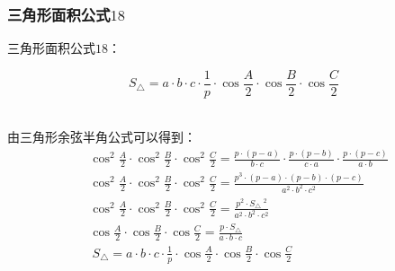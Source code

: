 \documentclass[UTF8]{ctexart}
\begin{document}
\newpage

\subsubsection{三角形面积公式$18$}
    三角形面积公式$18$：
    \begin{large}
        \begin{equation*}
            S_{\triangle}=a\cdot b\cdot c\cdot \frac{1}{p}\cdot\cos{\frac{A}{2}}\cdot\cos{\frac{B}{2}}\cdot\cos{\frac{C}{2}}
        \end{equation*}
    \end{large}\\
    由三角形余弦半角公式可以得到：\vspace{5pt}
    \setcounter{equation}{0}
    \begin{align}
        &\cos^2{\frac{A}{2}}\cdot\cos^2{\frac{B}{2}}\cdot\cos^2{\frac{C}{2}}=\frac{p\cdot(p-a)}{b\cdot c}\cdot\frac{p\cdot(p-b)}{c\cdot a}\cdot\frac{p\cdot(p-c)}{a\cdot b}\\[3mm]
        &\cos^2{\frac{A}{2}}\cdot\cos^2{\frac{B}{2}}\cdot\cos^2{\frac{C}{2}}=\frac{p^3\cdot(p-a)\cdot(p-b)\cdot(p-c)}{a^2\cdot b^2\cdot c^2}\\[3mm]
        &\cos^2{\frac{A}{2}}\cdot\cos^2{\frac{B}{2}}\cdot\cos^2{\frac{C}{2}}=\frac{p^2\cdot S_{\triangle}~^2}{a^2\cdot b^2\cdot c^2}\\[3mm]
        &\cos{\frac{A}{2}}\cdot\cos{\frac{B}{2}}\cdot\cos{\frac{C}{2}}=\frac{p\cdot S_{\triangle}}{a\cdot b\cdot c}\\[3mm]
        &~S_{\triangle}=a\cdot b\cdot c\cdot \frac{1}{p}\cdot\cos{\frac{A}{2}}\cdot\cos{\frac{B}{2}}\cdot\cos{\frac{C}{2}}
    \end{align}\\
\end{document}

